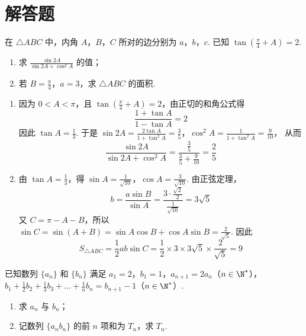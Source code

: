 \section{解答题}

\begin{problem}
在 \(\triangle ABC\) 中，内角 \(A\)，\(B\)，\(C\) 所对的边分别为 \(a\)，\(b\)，\(c\). 已知 \(\tan\left(\frac\pi4+A\right)=2\).

\begin{enumerate}
\item 求 \(\frac{\sin 2A}{\sin 2A+\cos^2 A}\) 的值；
\item 若 \(B=\frac\pi4\)，\(a=3\)，求 \(\triangle ABC\) 的面积.
\end{enumerate}
\end{problem}

\begin{solution}
\begin{enumerate}
\item 因为 \(0<A<\pi\)，且 \(\tan\left(\frac\pi4+A\right)=2\)，由正切的和角公式得
\[
\frac{1+\tan A}{1-\tan A}=2
\]
因此 \(\tan A=\frac13\). 于是
\(\sin2A=\frac{2\tan A}{1+\tan^2A}=\frac35\)，\(\cos^2A=\frac{1}{1+\tan^2A}=\frac9{10}\)，
从而
\[
\frac{\sin2A}{\sin2A+\cos^2A}=\frac{\frac35}{\frac35+\frac9{10}}=\frac25
\]

\item 由 \(\tan A=\frac13\)，得 \(\sin A=\frac1{\sqrt{10}}\)，\(\cos A=\frac3{\sqrt{10}}\). 由正弦定理，
\[
b=\frac{a\sin B}{\sin A}=\frac{3\cdot\frac{\sqrt2}{2}}{\frac1{\sqrt{10}}}=3\sqrt5
\]
又 \(C=\pi-A-B\)，所以 \(\sin C=\sin(A+B)=\sin A\cos B+\cos A\sin B=\frac2{\sqrt5}\). 因此
\[
S_{\triangle ABC}=\frac12ab\sin C=\frac12\times3\times3\sqrt5\times\frac2{\sqrt5}=9
\]
\end{enumerate}
\end{solution}

\begin{problem}
已知数列 \(\{a_n\}\) 和 \(\{b_n\}\) 满足 \(a_1=2\)，\(b_1=1\)，\(a_{n+1}=2a_n\)（\(n\in\N^{*}\)），\(b_1+\frac{1}{2}b_2+\frac{1}{3}b_3+\dots+\frac{1}{n}b_n=b_{n+1}-1\)（\(n\in\N^{*}\)）.

\begin{enumerate}
\item 求 \(a_n\) 与 \(b_n\)；
\item 记数列 \(\{a_nb_n\}\) 的前 \(n\) 项和为 \(T_n\)，求 \(T_n\).
\end{enumerate}
\end{problem}

